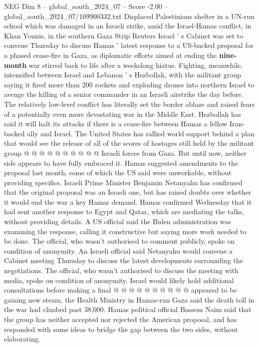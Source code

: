 \begin{textsample}{NEG Dim 8 – global\_south\_2024\_07 – Score -2.00 – global\_south\_2024\_07/109900332.txt}  \label{ex:f8_neg_108}
Displaced Palestinians shelter in a UN-run school which was damaged in an Israeli strike, amid the Israel-Hamas conflict, in Khan Younis, in the southern Gaza Strip Reuters Israel ' s Cabinet was set to convene Thursday to discuss Hamas ' latest response to a US-backed proposal for a phased cease-fire in Gaza, as diplomatic efforts aimed at ending the \textbf{nine-month} war stirred back to life after a weekslong hiatus.
Fighting, meanwhile, intensified between Israel and Lebanon ' s Hezbollah, with the militant group saying it fired more than 200 rockets and exploding drones into northern Israel to avenge the killing of a senior commander in an Israeli airstrike the day before.
The relatively low-level conflict has literally set the border ablaze and raised fears of a potentially even more devastating war in the Middle East.
Hezbollah has said it will halt its attacks if there is a cease-fire between Hamas a fellow Iran-backed ally and Israel.
The United States has rallied world support behind a plan that would see the release of all of the scores of hostages still held by the militant group @ @ @ @ @ @ @ @ @ @ Israeli forces from Gaza.
But until now, neither side appears to have fully embraced it.
Hamas suggested amendments to the proposal last month, some of which the US said were unworkable, without providing specifics.
Israeli Prime Minister Benjamin Netanyahu has confirmed that the original proposal was an Israeli one, but has raised doubts over whether it would end the war a key Hamas demand.
Hamas confirmed Wednesday that it had sent another response to Egypt and Qatar, which are mediating the talks, without providing details.
A US official said the Biden administration was examining the response, calling it constructive but saying more work needed to be done.
The official, who wasn't authorised to comment publicly, spoke on condition of anonymity.
An Israeli official said Netanyahu would convene a Cabinet meeting Thursday to discuss the latest developments surrounding the negotiations.
The official, who wasn't authorised to discuss the meeting with media, spoke on condition of anonymity.
Israel would likely hold additional consultations before making a final @ @ @ @ @ @ @ @ @ @ appeared to be gaining new steam, the Health Ministry in Hamas-run Gaza said the death toll in the war had climbed past 38,000.
Hamas political official Bassem Naim said that the group has neither accepted nor rejected the American proposal, and has responded with some ideas to bridge the gap between the two sides, without elaborating.

\end{textsample}
